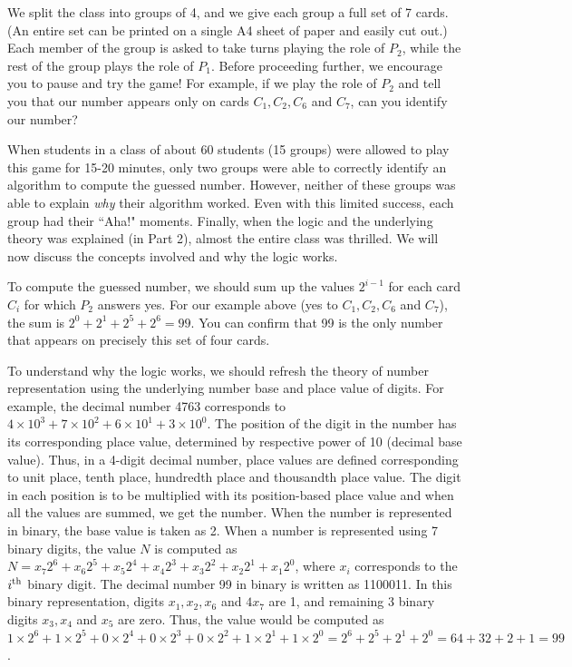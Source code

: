 \begin{multicols}{2}
\vspace{-.7cm}

We split the class into groups of 4, and we give each group a full set of 7 cards. (An entire set can be printed on a single A4 sheet of paper and easily cut out.) Each member of the group is asked to take turns playing the role of $P_{2}$, while the rest of the group plays the role of $P_{1}$. Before proceeding further, we encourage you to pause and try the game! For example, if we play the role of $P_{2}$ and tell you that our number appears only on cards $C_{1}, C_{2}, C_{6}$ and $C_{7}$, can you identify our number?


When students in a class of about 60 students (15 groups) were allowed to play this game for 15-20 minutes, only two groups were able to correctly identify an algorithm to compute the guessed number. However, neither of these groups was able to explain \textit{why} their algorithm worked. Even with this limited success, each group had their ``Aha!" moments. Finally, when the logic and the underlying theory was explained (in Part 2), almost the entire class was thrilled. We will now discuss the concepts involved and why the logic works.

To compute the guessed number, we should sum up the values $2^{i-1}$ for each card $C_{i}$ for which $P_{2}$ answers yes. For our example above (yes to $C_{1}, C_{2}, C_{6}$ and $C_{7}$), the sum is $2^{0} + 2^{1} + 2^{5} + 2^{6} = 99$. You can confirm that 99 is the only number that appears on precisely this set of four cards. 
 
To understand why the logic works, we should refresh the theory of number representation using the underlying number base and place value of digits. For example, the decimal number 4763 corresponds to $4\times10^{3}+7\times10^{2}+6\times10^{1}+3\times10^{0}$. The position of the digit in the number has its corresponding place value, determined by respective power of 10 (decimal base value). Thus, in a 4-digit decimal number, place values are defined corresponding to unit place, tenth place, hundredth place and thousandth place value. The digit in each position is to be multiplied with its position-based place value and when all the values are summed, we get the number.  When the number is represented in binary, the base value is taken as 2. When a number is represented using 7 binary digits, the value $N$ is computed as $N=x_{7}2^{6}+x_{6}2^{5}+x_{5}2^{4}+x_{4}2^{3} + x_{3}2^{2}+x_{2}2^{1} + x_{1}2^{0}$, where $x_{i}$ corresponds to the $i^{\rm th}$ binary digit. The decimal number 99 in binary is written as 1100011. In this binary representation, digits $x_{1},  x_{2}, x_{6}$ and $4x_{7}$ are 1, and remaining 3 binary digits $x_{3}, x_{4}$ and $x_{5}$ are zero. Thus, the value would be computed as $1\times2^{6} + 1\times 2^{5} + 0\times 2^{4} + 0\times 2^{3}+0\times 2^{2}+1\times 2^{1} +1\times 2^{0} = 2^{6} + 2^{5} + 2^{1} + 2^{0} = 64 + 32 + 2 + 1 = 99$. 


\end{multicols}
